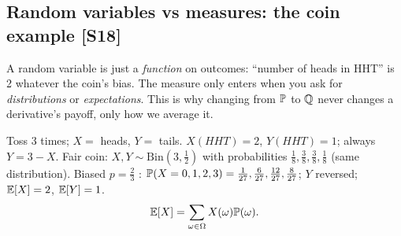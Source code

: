 \documentclass[10pt]{article}
\begin{document}
\subsection{Random variables vs measures: the coin example [S18]}
\begin{idea}
A random variable is just a \emph{function} on outcomes: ``number of heads in HHT'' is 2 whatever the coin's bias. The measure only enters when you ask for \emph{distributions} or \emph{expectations}. This is why changing from $\mathbb{P}$ to $\mathbb{Q}$ never changes a derivative's payoff, only how we average it.
\end{idea}
Toss 3 times; $X=$ heads, $Y=$ tails. $X(HHT)=2$, $Y(HHT)=1$; always $Y=3-X$. Fair coin: $X,Y\sim\mathrm{Bin}(3,\frac12)$ with probabilities $\frac18,\frac38,\frac38,\frac18$ (same distribution). Biased $p=\frac23$ \beyond: $\mathbb{P}(X=0,1,2,3)=\frac1{27},\frac6{27},\frac{12}{27},\frac8{27}$; $Y$ reversed; $\mathbb{E}[X]=2$, $\mathbb{E}[Y]=1$.
\[\mathbb{E}[X]=\sum_{\omega\in\Omega}X(\omega)\mathbb{P}(\omega).\]
\begin{where}
\end{where}
\end{document}
